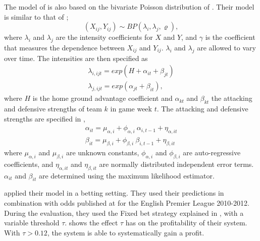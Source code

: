 The model of \citet{bib:koopman-lit-2015} is also based on the bivariate Poisson distribution of \citet{bib:maher-1982}. Their model is similar to that of \citet{bib:karlis-ntzoufras-2003};
\begin{equation*}
    (X_{ij}, Y_{ij}) \sim BP(\lambda_{i}, \lambda_{j}, \varrho),
\end{equation*}
where $\lambda_{i}$ and $\lambda_{j}$ are the intensity coefficients for $X$ and $Y$, and $\gamma$ is the coefficient that measures the dependence between $X_{ij}$ and $Y_{ij}$. $\lambda_{i}$ and $\lambda_{j}$ are allowed to vary over time. The intensities are then specified as
\begin{equation*}
    \begin{aligned}
        \lambda_{i, ijt} = exp(H + \alpha_{it} + \beta_{jt}) \\
        \lambda_{j, ijt} = exp(\alpha_{jt} + \beta_{it}),
    \end{aligned}
\end{equation*}
where $H$ is the home ground advantage coefficient and $\alpha_{kt}$ and $\beta_{kt}$ the attacking and defensive strengths of team $k$ in game week $t$. The attacking and defensive strengths are specified in ,
\begin{equation}
    \begin{aligned}
        \alpha_{it} = \mu_{\alpha, i}  + \phi_{\alpha, i}\ \alpha_{i, t-1} + \eta_{\alpha, it} \\
        \beta_{it} = \mu_{\beta, i}  + \phi_{\beta, i} \ \beta_{i, t-1} + \eta_{\beta, it}
    \end{aligned}
    \label{eq:koopman-lit-team-strengths}
\end{equation}
where $\mu_{\alpha, i}$ and $\mu_{\beta, i}$ are unknown constants, $\phi_{\alpha, i}$ and $\phi_{\beta, i}$ are auto-regressive coefficients, and $\eta_{\alpha, it}$ and $\eta_{\beta, it}$ are normally distributed independent error terms. $\alpha_{it}$ and $\beta_{it}$ are determined using the maximum likelihood estimator.

\citet{bib:koopman-lit-2015} applied their model in a betting setting. They used their predictions in combination with odds published at \citet{bib:football-data} for the English Premier League 2010-2012. During the evaluation, they used the Fixed bet strategy explained in , with a variable threshold $\tau$.  shows the effect $\tau$ has on the profitability of their system. With $\tau > 0.12$, the system is able to systematically gain a profit.


